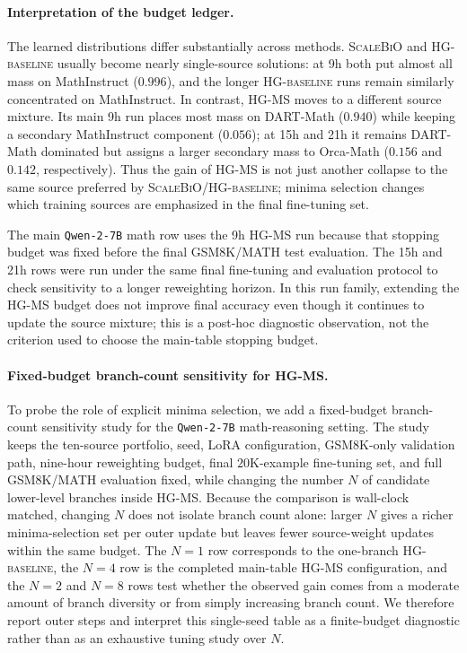 \documentclass{article}
\theoremstyle{normaltheorem}
\begin{document}
\paragraph{Interpretation of the budget ledger.}
The learned distributions differ substantially across methods. \textsc{ScaleBiO} and \textsc{HG-baseline} usually become nearly single-source solutions: at 9h both put almost all mass on MathInstruct (\(0.996\)), and the longer \textsc{HG-baseline} runs remain similarly concentrated on MathInstruct. In contrast, \textsc{HG-MS} moves to a different source mixture. Its main 9h run places most mass on DART-Math (\(0.940\)) while keeping a secondary MathInstruct component (\(0.056\)); at 15h and 21h it remains DART-Math dominated but assigns a larger secondary mass to Orca-Math (\(0.156\) and \(0.142\), respectively). Thus the gain of \textsc{HG-MS} is not just another collapse to the same source preferred by \textsc{ScaleBiO}/\textsc{HG-baseline}; minima selection changes which training sources are emphasized in the final fine-tuning set.

The main \texttt{Qwen-2-7B} math row uses the 9h \textsc{HG-MS} run because that stopping budget was fixed before the final GSM8K/MATH test evaluation. The 15h and 21h rows were run under the same final fine-tuning and evaluation protocol to check sensitivity to a longer reweighting horizon. In this run family, extending the \textsc{HG-MS} budget does not improve final accuracy even though it continues to update the source mixture; this is a post-hoc diagnostic observation, not the criterion used to choose the main-table stopping budget.

\paragraph{Fixed-budget branch-count sensitivity for \textsc{HG-MS}.}
To probe the role of explicit minima selection, we add a fixed-budget branch-count sensitivity study for the \texttt{Qwen-2-7B} math-reasoning setting. The study keeps the ten-source portfolio, seed, LoRA configuration, GSM8K-only validation path, nine-hour reweighting budget, final \(20\)K-example fine-tuning set, and full GSM8K/MATH evaluation fixed, while changing the number \(N\) of candidate lower-level branches inside \textsc{HG-MS}. Because the comparison is wall-clock matched, changing \(N\) does not isolate branch count alone: larger \(N\) gives a richer minima-selection set per outer update but leaves fewer source-weight updates within the same budget. The \(N=1\) row corresponds to the one-branch \textsc{HG-baseline}, the \(N=4\) row is the completed main-table \textsc{HG-MS} configuration, and the \(N=2\) and \(N=8\) rows test whether the observed gain comes from a moderate amount of branch diversity or from simply increasing branch count. We therefore report outer steps and interpret this single-seed table as a finite-budget diagnostic rather than as an exhaustive tuning study over \(N\).
\end{document}
